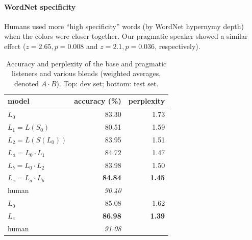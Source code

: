 \documentclass[11pt,letterpaper]{article}
\newcommand{\Listener}{L}
\newcommand{\Speaker}{S}
\renewcommand{\|}{\mid}
\newcommand{\best}[1]{\textbf{#1}}
\newcommand{\oracle}[1]{\textit{#1}}
\begin{document}
\paragraph{WordNet specificity} Humans used more ``high specificity'' words
(by WordNet hypernymy depth) when the colors were closer together.
Our pragmatic speaker showed a similar effect ($z = 2.65, p =0.008$ and
$z = 2.1, p =0.036$, respectively).

\begin{table}[t]
\centering
\begin{tabular}{lrr}
  \toprule
  model & accuracy (\%) & perplexity \\
  \midrule
  $\Listener_0$                                      & 83.30 & 1.73 \\
  $\Listener_1 = \Listener(\Speaker_0)$              & 80.51 & 1.59 \\
  $\Listener_2 = \Listener(\Speaker(\Listener_0))$   & 83.95 & 1.51 \\
  $\Listener_a = \Listener_0 \cdot \Listener_1$      & 84.72 & 1.47 \\
  $\Listener_b = \Listener_0 \cdot \Listener_2$      & 83.98 & 1.50 \\
  $\Listener_e = \Listener_a \cdot \Listener_b$      & \best{84.84} & \best{1.45}
  \\[0.5ex]
  human & \oracle{90.40} \\
  \midrule
  $\Listener_0$                                      & 85.08 & 1.62 \\
  $\Listener_e$                                      & \best{86.98} & \best{1.39}
  \\[0.5ex]
  human & \oracle{91.08} \\
  \bottomrule
\end{tabular}
\caption{Accuracy and perplexity of the base and pragmatic listeners and
various blends (weighted averages, denoted $A \cdot B$).
Top: dev set; bottom: test set.}
\label{table:modelAccuracy}
\end{table}
\end{document}
